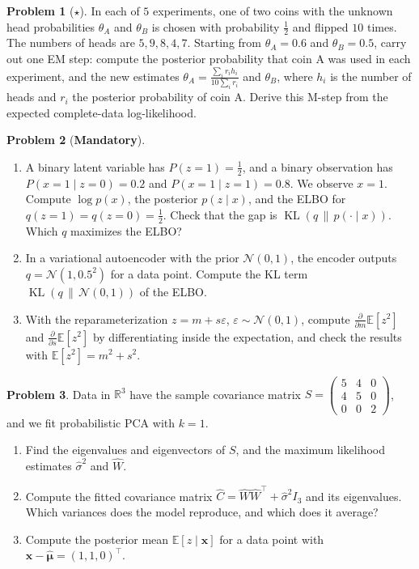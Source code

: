 \documentclass[11pt]{article}
\theoremstyle{definition}
\newtheorem{problem}{Problem}[section]
\newcommand{\mandatory}{\textcolor{red!70!black}{\textbf{Mandatory}}}
\newcommand{\E}{\mathbb{E}}
\DeclareMathOperator{\KL}{KL}
\begin{document}
\begin{problem}[$\star$]\label{pr:em-coins}
    In each of $5$ experiments, one of two coins with the unknown head probabilities $\theta_A$ and $\theta_B$ is chosen with probability $\frac{1}{2}$ and flipped $10$ times. The numbers of heads are $5, 9, 8, 4, 7$. Starting from $\theta_A = 0.6$ and $\theta_B = 0.5$, carry out one EM step: compute the posterior probability that coin A was used in each experiment, and the new estimates $\theta_A = \frac{\sum_i r_i h_i}{10\sum_i r_i}$ and $\theta_B$, where $h_i$ is the number of heads and $r_i$ the posterior probability of coin A. Derive this M-step from the expected complete-data log-likelihood.
\end{problem}

\begin{problem}[\mandatory]\label{pr:elbo}
    \begin{enumerate}[label=(\alph*)]
        \item A binary latent variable has $P(z = 1) = \frac{1}{2}$, and a binary observation has $P(x = 1 \mid z = 0) = 0.2$ and $P(x = 1 \mid z = 1) = 0.8$. We observe $x = 1$. Compute $\log p(x)$, the posterior $p(z \mid x)$, and the ELBO for $q(z = 1) = q(z = 0) = \frac{1}{2}$. Check that the gap is $\KL(q \,\|\, p(\cdot \mid x))$. Which $q$ maximizes the ELBO?
        \item In a variational autoencoder with the prior $\mathcal{N}(0, 1)$, the encoder outputs $q = \mathcal{N}(1, 0.5^2)$ for a data point. Compute the KL term $\KL(q \,\|\, \mathcal{N}(0, 1))$ of the ELBO.
        \item With the reparameterization $z = m + s\varepsilon$, $\varepsilon \sim \mathcal{N}(0, 1)$, compute $\frac{\partial}{\partial m}\E[z^2]$ and $\frac{\partial}{\partial s}\E[z^2]$ by differentiating inside the expectation, and check the results with $\E[z^2] = m^2 + s^2$.
    \end{enumerate}
\end{problem}

\begin{problem}\label{pr:ppca}
    Data in $\mathbb{R}^3$ have the sample covariance matrix $S = \begin{pmatrix} 5 & 4 & 0 \\ 4 & 5 & 0 \\ 0 & 0 & 2 \end{pmatrix}$, and we fit probabilistic PCA with $k = 1$.
    \begin{enumerate}[label=(\alph*)]
        \item Find the eigenvalues and eigenvectors of $S$, and the maximum likelihood estimates $\hat\sigma^2$ and $\hat W$.
        \item Compute the fitted covariance matrix $\hat C = \hat W\hat W^\top + \hat\sigma^2I_3$ and its eigenvalues. Which variances does the model reproduce, and which does it average?
        \item Compute the posterior mean $\E[z \mid \mathbf{x}]$ for a data point with $\mathbf{x} - \hat{\boldsymbol{\mu}} = (1, 1, 0)^\top$.
    \end{enumerate}
\end{problem}
\end{document}
